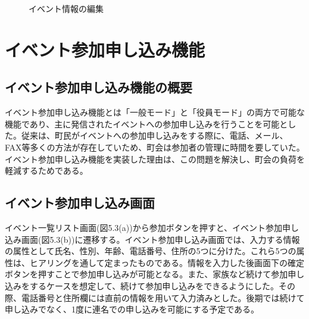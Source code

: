 \begin{figure}[htbp]
\begin{center}
\begin{tabular}{c}
    \end{tabular}
    \caption{イベント情報の編集}
    \label{fig:lena}
  \end{center}
\end{figure}

\section{イベント参加申し込み機能}%
\subsection{イベント参加申し込み機能の概要}%
イベント参加申し込み機能とは「一般モード」と「役員モード」の両方で可能な機能であり、主に発信されたイベントへの参加申し込みを行うことを可能とした。従来は、町民がイベントへの参加申し込みをする際に、電話、メール、FAX等多くの方法が存在していため、町会は参加者の管理に時間を要していた。イベント参加申し込み機能を実装した理由は、この問題を解決し、町会の負荷を軽減するためである。

\subsection{イベント参加申し込み画面}%
イベント一覧リスト画面(図5.3(a))から参加ボタンを押すと、イベント参加申し込み画面(図5.3(b))に遷移する。イベント参加申し込み画面では、入力する情報の属性として氏名、性別、年齢、電話番号、住所の5つに分けた。これら5つの属性は、ヒアリングを通して定まったものである。情報を入力した後画面下の確定ボタンを押すことで参加申し込みが可能となる。また、家族など続けて参加申し込みをするケースを想定して、続けて参加申し込みをできるようにした。その際、電話番号と住所欄には直前の情報を用いて入力済みとした。後期では続けて申し込みでなく、1度に連名での申し込みを可能にする予定である。

